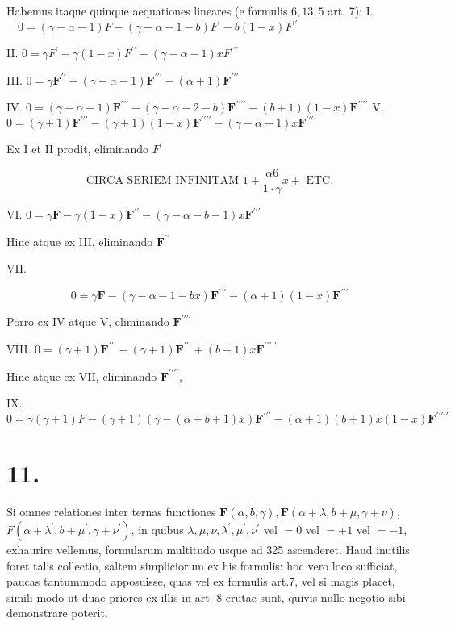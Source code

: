 \documentclass[10pt]{article}
\begin{document}
Habemus itaque quinque aequationes lineares (e formulis \(6,13,5\) art. 7):
I. \(\quad 0=(\gamma-\alpha-1) F-(\gamma-\alpha-1-b) F^{\prime}-b(1-x) F^{\prime \prime}\)

II. \(0=\gamma F^{\prime}-\gamma(1-x) F^{\prime \prime}-(\gamma-\alpha-1) x F^{\prime \prime \prime}\)

III. \(0=\gamma \boldsymbol{F}^{\prime \prime}-(\gamma-\alpha-1) \boldsymbol{F}^{\prime \prime \prime}-(\alpha+1) \boldsymbol{F}^{\prime \prime \prime}\)

IV. \(0=(\gamma-\alpha-1) \boldsymbol{F}^{\prime \prime \prime}-(\gamma-\alpha-2-b) \boldsymbol{F}^{\prime \prime \prime \prime}-(b+1)(1-x) \boldsymbol{F}^{\prime \prime \prime \prime}\)
V. \(0=(\gamma+1) \boldsymbol{F}^{\prime \prime \prime}-(\gamma+1)(1-x) \boldsymbol{F}^{\prime \prime \prime \prime}-(\gamma-\alpha-1) x \boldsymbol{F}^{\prime \prime \prime \prime}\)

Ex I et II prodit, eliminando \(F^{\prime}\)

\[
\text { CIRCA SERIEM INFINITAM } 1+\frac{\alpha 6}{1 \cdot \gamma} x+\text { ETC. }
\]

VI. \(0=\gamma \boldsymbol{F}-\gamma(1-x) \boldsymbol{F}^{\prime \prime}-(\gamma-\alpha-b-1) x \boldsymbol{F}^{\prime \prime \prime}\)

Hinc atque ex III, eliminando \(\boldsymbol{F}^{\prime \prime}\)

VII.

\[
0=\gamma \boldsymbol{F}-(\gamma-\alpha-1-b x) \boldsymbol{F}^{\prime \prime \prime}-(\alpha+1)(1-x) \boldsymbol{F}^{\prime \prime \prime}
\]

Porro ex IV atque V, eliminando \(\boldsymbol{F}^{\prime \prime \prime \prime}\)

VIII. \(0=(\gamma+1) \boldsymbol{F}^{\prime \prime \prime}-(\gamma+1) \boldsymbol{F}^{\prime \prime \prime}+(b+1) x \boldsymbol{F}^{\prime \prime \prime \prime \prime}\)

Hinc atque ex VII, eliminando \(\boldsymbol{F}^{\prime \prime \prime \prime}\),

IX. \(0=\gamma(\gamma+1) F-(\gamma+1)(\gamma-(\alpha+b+1) x) \boldsymbol{F}^{\prime \prime \prime}-(\alpha+1)(b+1) x(1-x) \boldsymbol{F}^{\prime \prime \prime \prime \prime}\)

\section*{11.}
Si omnes relationes inter ternas functiones \(\boldsymbol{F}(\alpha, b, \gamma), \boldsymbol{F}(\alpha+\lambda, b+\mu, \gamma+\nu)\), \(F\left(\alpha+\lambda^{\prime}, b+\mu^{\prime}, \gamma+\nu^{\prime}\right)\), in quibus \(\lambda, \mu, \nu, \lambda^{\prime}, \mu^{\prime}, \nu^{\prime}\) vel \(=0\) vel \(=+1\) vel \(=-1\), exhaurire vellemus, formularum multitudo usque ad 325 ascenderet. Haud inutilis foret talis collectio, saltem simpliciorum ex his formulis: hoc vero loco sufficiat, paucas tantummodo apposuisse, quas vel ex formulis art.7, vel si magis placet, simili modo ut duae priores ex illis in art. 8 erutae sunt, quivis nullo negotio sibi demonstrare poterit.
\end{document}
